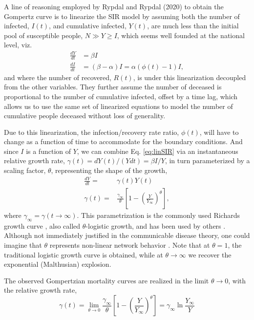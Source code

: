 \documentclass[sn-mathphys]{sn-jnl}%
\theoremstyle{thmstyleone}%
\theoremstyle{thmstyletwo}%
\theoremstyle{thmstylethree}%
\begin{document}
A line of reasoning employed by Rypdal and Rypdal (2020) \cite{Rypdal2020} to obtain the Gompertz curve is to linearize the SIR model by assuming
both the number of infected, $I(t)$, and cumulative infected, $Y(t)$, are much less than the initial pool of susceptible people, $N \gg Y \ge I$, which seems well founded at the national level, viz.
\begin{align}
\label{eq:linSIR}
\frac{dY}{dt}& = \beta I\\
\frac{dI}{dt}& = (\beta - \alpha) I = \alpha (\phi(t) - 1) I,
\end{align}
and where the number of recovered, $R(t)$, is under this linearization decoupled from the other variables. They further assume the number of deceased is proportional to the number of cumulative infected, offset by a time lag, which allows us to use the same set of linearized equations to model the number of cumulative people deceased without loss of generality.

 Due to this linearization, the infection/recovery rate ratio, $\phi(t)$, will have to change as a function of time to accommodate for the boundary conditions. And since $I$ is a function of $Y$, we can combine Eq. \ref{eq:linSIR} via an instantaneous relative growth rate, $\gamma(t) = dY(t) /(Ydt) = \beta I / Y$, in turn parameterized by a scaling factor, $\theta$, representing the shape of the growth,
\begin{subequations}
\label{eq:rypdal}
\begin{align}
\frac{dY}{dt} =& \gamma(t) Y(t) \label{eq:rypdalODE}\\
\gamma(t) =& \frac{\gamma_{\infty}}{\theta}\left[1 - \left(\frac{Y}{Y_{\infty}}\right)^{\theta} \right] \label{eq:rypdalGamma},
\end{align}
\end{subequations}
where $\gamma_{\infty} = \gamma(t\rightarrow \infty)$. This parametrization is the commonly used Richards growth curve \cite{richards1959flexible}, also called $\theta$-logistic growth, and has been used by others \cite{wu2020generalized}. Although not immediately justified in the communicable disease theory, one could imagine that $\theta$ represents non-linear network behavior \cite{petroni2020logistic}. Note that at $\theta=1$, the traditional logistic growth curve is obtained, while at $\theta\rightarrow \infty$ we recover the exponential (Malthusian) explosion.

The observed Gompertzian mortality curves are realized in the limit $\theta \rightarrow 0$, with the relative growth rate, 
\begin{equation}
\label{eq:rypdalLimit}
\gamma(t) = \lim_{\theta \rightarrow 0}\frac{\gamma_{\infty}}{\theta}\left[1 - \left(\frac{Y}{Y_{\infty}}\right)^{\theta} \right]
= \gamma_{\infty}\ln{\frac{Y_{\infty}}{Y}}
\end{equation}
\end{document}
